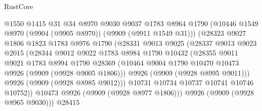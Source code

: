 \begin{lexlean}{RustCore}
\begin{coremodule}
                            @1550
                            @1415
                            @31
                            @34
                            @8970
                            @9030
                            @9037
                            @1783
                            @8964
                            @1790
                            (@10446 @1549 @8970 (@9904 (@9905 @8970)) (@9909 (@9911 @1549 @31)))
                            (@28323
                              @9027
                              @1806
                              @1823
                              @1783
                              @8976
                              @1790
                              (@28331
                                @9013
                                @9025
                                (@28337
                                  @9013
                                  @9023
                                  @2015
                                  (@28344
                                    @9012
                                    @9022
                                    @1783
                                    @8984
                                    @1790
                                    @10432
                                    (@28355
                                      @9011
                                      @9021
                                      @1783
                                      @8994
                                      @1790
                                      @28369
                                      (@10464
                                        @9004
                                        @1790
                                        @10470
                                        @10473
                                        @9926
                                        (@9909 (@9928 @9005 @1806)))
                                      @9926
                                      (@9909 (@9928 @8995 @9011)))
                                    @9926
                                    (@9909 (@9928 @8985 @9012)))
                                  @10731
                                  @10734
                                  @10737
                                  @10741
                                  @10746
                                  @10752))
                              @10473
                              @9926
                              (@9909 (@9928 @8977 @1806)))
                            @9926
                            (@9909 (@9928 @8965 @9030)))
                          @28415

\end{coremodule}
\end{lexlean}
